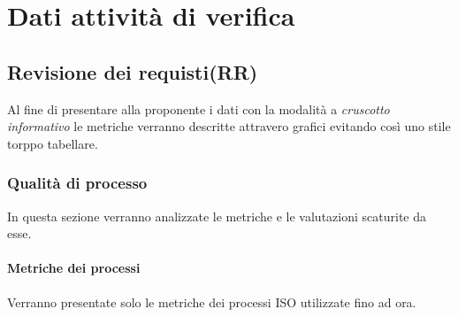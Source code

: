 \section{Dati attività di verifica}
\subsection{Revisione dei requisti(RR)}
Al fine di presentare alla proponente i dati con la modalità a \textit{cruscotto informativo} le metriche verranno descritte attravero grafici evitando così uno stile torppo tabellare.
\subsubsection{Qualità di processo}
In questa sezione verranno analizzate le metriche e le valutazioni scaturite da esse.
\paragraph{Metriche dei processi}
\hspace{15cm}
Verranno presentate solo le metriche dei processi ISO utilizzate fino ad ora.
\begin{table}[]
\end{table}
